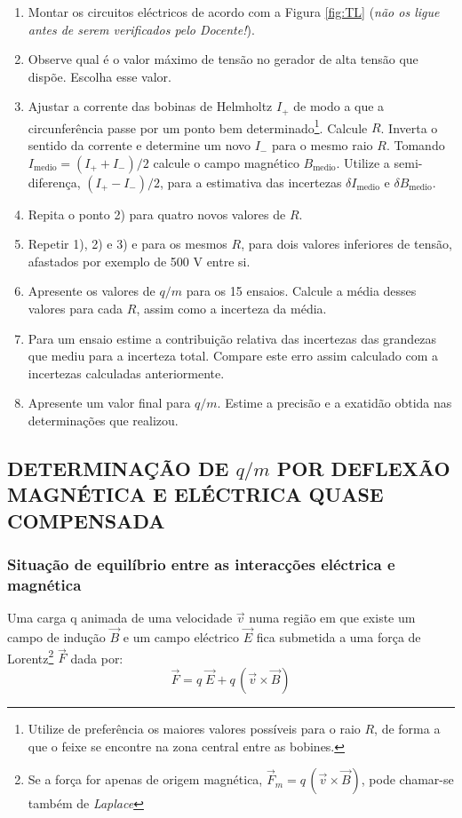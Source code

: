 \documentclass[a4paper,twoside,12pt]{article}      %
\begin{document}
\begin{enumerate}
	\item Montar os circuitos eléctricos de acordo com a  Figura \ref{fig:TL} 
	(\emph{não os ligue antes de serem verificados pelo Docente!}).
	\item Observe qual é o valor máximo de tensão no gerador de  alta tensão que dispõe. Escolha esse valor.
	\item Ajustar a corrente das bobinas de Helmholtz $I_+$ de modo a que a circunferência passe por um ponto bem determinado\footnote{Utilize de preferência os maiores valores possíveis para o raio $R$, de forma a que o feixe se encontre na zona central entre as bobines.}.  Calcule $R$.
	Inverta o sentido da corrente e determine um novo $I_-$ para o mesmo raio $R$.
	Tomando $I_{\textrm{medio}} = (I_+ + I_-)/2 $ calcule o campo magnético $B_{\textrm{medio}}$. Utilize a semi-diferença, $(I_+ - I_-)/2$, para a estimativa das incertezas $\delta I_{\textrm{medio}}$ e $\delta B_{\textrm{medio}}$.
	\item Repita o ponto 2) para quatro novos valores de $R$. 
	\item Repetir 1), 2) e 3)  e para os mesmos $R$, para dois valores inferiores de tensão, afastados por exemplo de 500 V entre si.
	\item Apresente os valores de $q/m$ para os 15 ensaios. Calcule a média desses valores para cada $R$, assim como a incerteza da média.
	\item Para um ensaio estime a contribuição relativa das incertezas das grandezas que mediu para a incerteza total. Compare este erro assim calculado com a incertezas calculadas anteriormente.
	\item Apresente um valor final para $q/m$. Estime a precisão e a exatidão obtida nas determinações que realizou.
\end{enumerate}
 
\subsection{\sf DETERMINAÇÃO DE $q/m$ POR DEFLEXÃO\\ MAGNÉTICA E ELÉCTRICA QUASE COMPENSADA }

\subsubsection{\sf Situação de equilíbrio entre as interacções eléctrica e magnética}
Uma carga q animada de uma velocidade $\vec{v}$ numa região em que existe um campo de indução $\vec{B}$ e um campo eléctrico $\vec{E}$ fica submetida a uma força de Lorentz\footnote{Se a força for apenas de origem magnética, $\vec{F}_m =  q\,(\vec{v} \times \vec{B})$, pode chamar-se também de \emph{Laplace}} $\vec{F}$ dada por:
\begin{equation}
	\label{eq:Lorentz}
 \vec{F} = q\; \vec{E} + q\,(\vec{v} \times \vec{B})
\end{equation}
\end{document}

